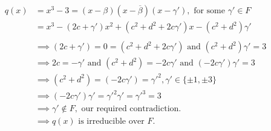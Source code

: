 \begin{align*}
    q(x) &= x^3 - 3 =
    (x - \beta)(x - \overline{\beta})(x - \gamma'), \text{ for some } \gamma' \in F \\
    &= x^3 - (2c + \gamma')x^2 + (c^2 + d^2 + 2c\gamma')x - (c^2 + d^2)\gamma' \\
    \\
    &\implies (2c + \gamma') = 0 = (c^2 + d^2 + 2c\gamma') \text{ and } (c^2 + d^2)\gamma' = 3
    \\
    &\implies 2c = -\gamma' \text{ and } (c^2 + d^2) = -2c\gamma' \text{ and } (-2c\gamma')\gamma' = 3 \\
    &\implies (c^2 + d^2) = (-2c\gamma') = \gamma'^2, \gamma' \in \{\pm 1, \pm 3\} \\
    &\implies (-2c\gamma')\gamma' = \gamma'^2\gamma' = \gamma'^3 = 3 \\
    &\implies \gamma' \not\in F, \text{ our required contradiction.} \\
    &\implies q(x) \text{ is irreducible over } F.
\end{align*}